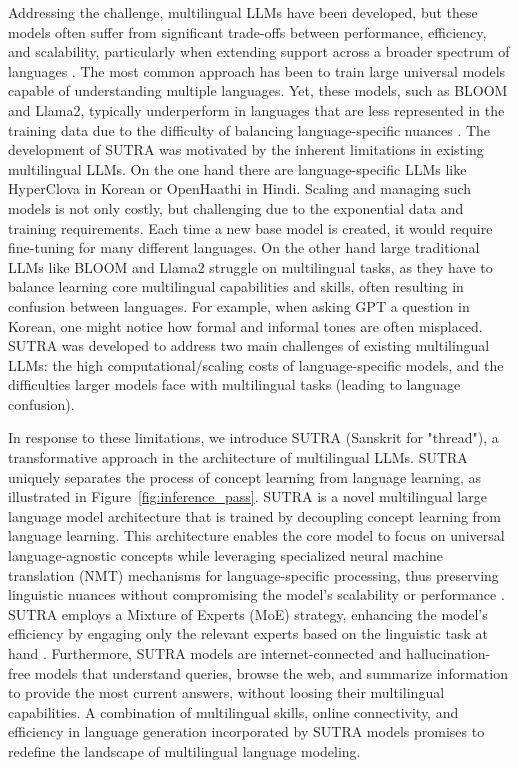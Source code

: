 \documentclass{article}
\begin{document}
Addressing the challenge, multilingual LLMs have been developed, but these models often suffer from significant trade-offs between performance, efficiency, and scalability, particularly when extending support across a broader spectrum of languages \citep{conneau2020unsupervised}.
The most common approach has been to train large universal models capable of understanding multiple languages.
Yet, these models, such as BLOOM and Llama2, typically underperform in languages that are less represented in the training data due to the difficulty of balancing language-specific nuances \citep{smith2021can, zhang2020improving}.
The development of SUTRA was motivated by the inherent limitations in existing multilingual LLMs.
On the one hand there are language-specific LLMs like HyperClova in Korean or OpenHaathi in Hindi.
Scaling and managing such models is not only costly, but challenging due to the exponential data and training requirements.
Each time a new base model is created, it would require fine-tuning for many different languages.
On the other hand large traditional LLMs like BLOOM and Llama2 struggle on multilingual tasks, as they have to balance learning core multilingual capabilities and skills, often resulting in confusion between languages.
For example, when asking GPT a question in Korean, one might notice how formal and informal tones are often misplaced.
SUTRA was developed to address two main challenges of existing multilingual LLMs: the high computational/scaling costs of language-specific models, and the difficulties larger models face with multilingual tasks (leading to language confusion).

In response to these limitations, we introduce SUTRA (Sanskrit for "thread"), a transformative approach in the architecture of multilingual LLMs.
SUTRA uniquely separates the process of concept learning from language learning, as illustrated in Figure~\ref{fig:inference_pass}.
SUTRA is a novel multilingual large language model architecture that is trained by decoupling concept learning from language learning.
This architecture enables the core model to focus on universal language-agnostic concepts while leveraging specialized neural machine translation (NMT) mechanisms for language-specific processing, thus preserving linguistic nuances without compromising the model's scalability or performance \citep{wu2019google}.
SUTRA employs a Mixture of Experts (MoE) strategy, enhancing the model's efficiency by engaging only the relevant experts based on the linguistic task at hand \citep{shazeer2017outrageously}.
Furthermore, SUTRA models are internet-connected and hallucination-free models that understand queries, browse the web, and summarize information to provide the most current answers, without loosing their multilingual capabilities.
A combination of multilingual skills, online connectivity, and efficiency in language generation incorporated by SUTRA models promises to redefine the landscape of multilingual language modeling.
\end{document}
